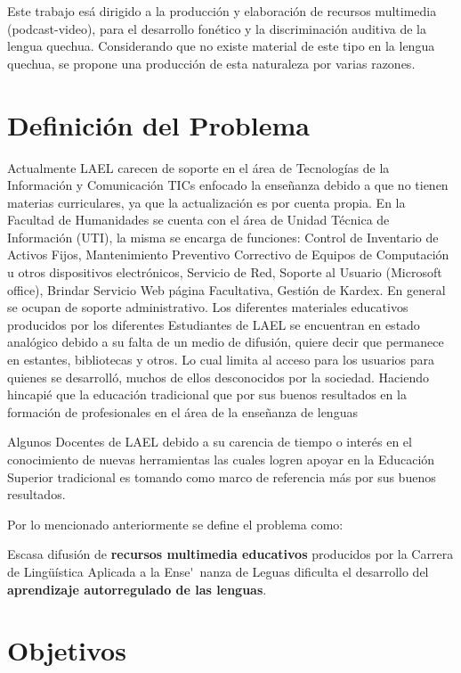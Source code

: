 Este trabajo es\'{a} dirigido a la producci\'{o}n y elaboraci\'{o}n de recursos
multimedia (podcast-video), para el desarrollo fon\'{e}tico y la discriminaci\'{o}n
auditiva de la lengua quechua. Considerando que no existe material de este tipo en
la lengua quechua, se propone una producci\'{o}n de esta naturaleza por varias 
razones.\cite{CGL2015}

\section{Definici\'{o}n del Problema}

Actualmente LAEL carecen de soporte en el \'{a}rea de Tecnolog\'{i}as de la 
Informaci\'{o}n y Comunicaci\'{o}n TICs enfocado la ense\~{n}anza debido a que
no tienen materias curriculares, ya que la actualizaci\'{o}n es por cuenta propia. 
En la Facultad de Humanidades se cuenta con el \'{a}rea de Unidad T\'{e}cnica
de Informaci\'{o}n (UTI), la misma se encarga de funciones: Control de Inventario
de Activos Fijos, Mantenimiento Preventivo Correctivo de Equipos de Computaci\'{o}n
u otros dispositivos electr\'{o}nicos, Servicio de Red, Soporte al Usuario (Microsoft
office), Brindar Servicio Web p\'{a}gina Facultativa, Gesti\'{o}n de Kardex. En 
general se ocupan de soporte administrativo. Los diferentes materiales educativos
producidos por los diferentes Estudiantes de LAEL se encuentran en estado 
anal\'{o}gico debido a su falta de un medio de difusi\'{o}n, quiere decir que 
permanece en estantes, bibliotecas y otros. Lo cual limita al acceso para los
usuarios para quienes se desarroll\'{o}, muchos de ellos desconocidos por la sociedad.
Haciendo hincapi\'{e} que la educaci\'{o}n tradicional que por sus buenos resultados en 
la formaci\'{o}n de profesionales en el \'{a}rea de la ense\~{n}anza de lenguas

Algunos Docentes de LAEL debido a su carencia de tiempo o inter\'{e}s en el 
conocimiento de nuevas herramientas las cuales logren apoyar en la Educaci\'{o}n
Superior tradicional es tomando como marco de referencia m\'{a}s por sus buenos resultados.

Por lo mencionado anteriormente se define el problema como:

Escasa difusi\'{o}n de \textbf{recursos multimedia educativos} producidos por 
la Carrera de Ling\"{u}\'{i}stica Aplicada a la Ense\'~{n}anza de Leguas dificulta
el desarrollo del \textbf{aprendizaje autorregulado de las lenguas}.

\section{Objetivos}

